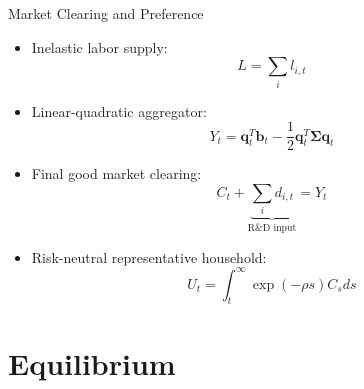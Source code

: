 \documentclass[
  10pt,               %
  aspectratio=169,     %
]{beamer}
\theoremstyle{plain}
\begin{document}
%
\begin{frame}{Market Clearing and Preference}
  \begin{itemize}
    \item Inelastic labor supply:
          \[
            L=\sum_{i}l_{i,t}
          \]
    \item Linear-quadratic aggregator:
          \[
            Y_{t}=\bm{q}_{t}^{T}\bm{b}_{t}-\frac{1}{2}\bm{q}_{t}^{T}\bm{\Sigma}\bm{q}_{t}
          \]
    \item Final good market clearing:
          \[
            C_{t}+\underbrace{\sum_{i}d_{i,t}}_{\text{R\&D input}}=Y_{t}
          \]
    \item Risk-neutral representative household:
          \[
            U_t = \int_{t}^{\infty}\exp\left(-\rho s\right)C_{s}ds
          \]
  \end{itemize}
\end{frame}
%
\section{Equilibrium}
\end{document}
